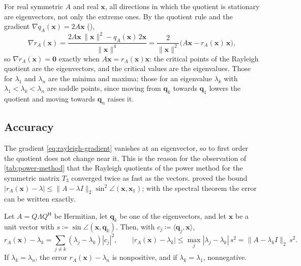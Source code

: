 For real symmetric $A$ and real $\mathbf x$, all directions in which the quotient is stationary are eigenvectors, not only the extreme ones. By the quotient rule and the gradient $\nabla q_A(\mathbf x)=2A\mathbf x$ (),
\begin{equation}
\nabla r_A(\mathbf x)=\frac{2A\mathbf x\,\|\mathbf x\|^2-q_A(\mathbf x)\,2\mathbf x}{\|\mathbf x\|^4}=\frac2{\|\mathbf x\|^2}\bigl(A\mathbf x-r_A(\mathbf x)\,\mathbf x\bigr),
\label{eq:rayleigh-gradient}
\end{equation}
so $\nabla r_A(\mathbf x)=\mathbf 0$ exactly when $A\mathbf x=r_A(\mathbf x)\mathbf x$: the critical points of the Rayleigh quotient are the eigenvectors, and the critical values are the eigenvalues. Those for $\lambda_1$ and $\lambda_n$ are the minima and maxima; those for an eigenvalue $\lambda_k$ with $\lambda_1<\lambda_k<\lambda_n$ are saddle points, since moving from $\mathbf q_k$ towards $\mathbf q_1$ lowers the quotient and moving towards $\mathbf q_n$ raises it.

\subsection{Accuracy}

The gradient \eqref{eq:rayleigh-gradient} vanishes at an eigenvector, so to first order the quotient does not change near it. This is the reason for the observation of \cref{tab:power-method} that the Rayleigh quotients of the power method for the symmetric matrix $T_3$ converged twice as fast as the vectors.  proved the bound $|r_A(\mathbf x)-\lambda|\le\|A-\lambda I\|_2\sin^2\angle(\mathbf x,\mathbf x_1)$; with the spectral theorem the error can be written exactly.

\begin{proposition}
\label{prop:rayleigh-quadratic}
Let $A=Q\Lambda Q^{\mathsf H}$ be Hermitian, let $\mathbf q_k$ be one of the eigenvectors, and let $\mathbf x$ be a unit vector with $s\coloneqq\sin\angle(\mathbf x,\mathbf q_k)$. Then, with $c_j\coloneqq\langle\mathbf q_j,\mathbf x\rangle$,
\[
r_A(\mathbf x)-\lambda_k=\sum_{j\ne k}(\lambda_j-\lambda_k)|c_j|^2,\qquad|r_A(\mathbf x)-\lambda_k|\le\max_j|\lambda_j-\lambda_k|\,s^2=\|A-\lambda_kI\|_2\,s^2 .
\]
If $\lambda_k=\lambda_n$, the error $r_A(\mathbf x)-\lambda_n$ is nonpositive, and if $\lambda_k=\lambda_1$, nonnegative.
\end{proposition}

